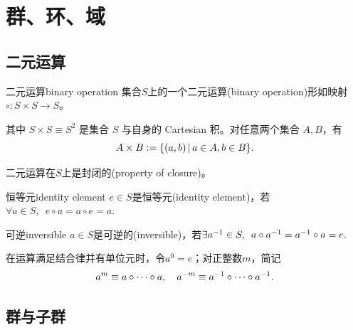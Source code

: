 \chapter{群、环、域}

\section{二元运算}

\begin{definition}{二元运算}{binary operation}
	集合$S$上的一个二元运算(binary operation)形如映射$\circ :S \times S \to S$。

	其中 $S \times S \equiv S^2$ 是集合 $S$ 与自身的 Cartesian 积。对任意两个集合 $A,B$，有
	\begin{equation}\label{eq:la-cartesian-product}
		A \times B := \{(a,b)\,\vert\,a \in A, b \in B\}.
	\end{equation}
\end{definition}
二元运算在$S$上是封闭的(property of closure)。
\begin{definition}{恒等元}{identity element}
	$e \in S$是恒等元(identity element)，若$\forall a \in S,\enspace e \circ a = a \circ e = a.$
\end{definition}
\begin{definition}{可逆}{inversible}
	$a \in S$是可逆的(inversible)，若$\exists a^{-1} \in S,\enspace a \circ a^{-1} = a^{-1} \circ a = e.$
\end{definition}
在运算满足结合律并有单位元时，令$a^0 = e$；对正整数$m$，简记
\[
	a^m \equiv a \circ \cdots \circ a,\quad a^{-m} \equiv a^{-1} \circ \cdots \circ a^{-1}.
\]

\section{群与子群}


